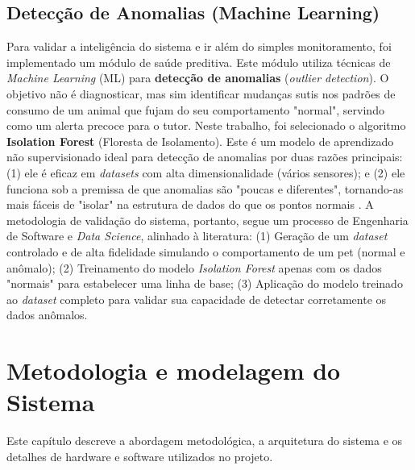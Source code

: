 \section{Detecção de Anomalias (Machine Learning)}
\label{sec:ml_theory}
Para validar a inteligência do sistema e ir além do simples monitoramento, foi implementado um módulo de saúde preditiva.
Este módulo utiliza técnicas de \textit{Machine Learning} (ML) para \textbf{detecção de anomalias} (\textit{outlier detection}).
O objetivo não é diagnosticar, mas sim identificar mudanças sutis nos padrões de consumo de um animal que fujam do seu comportamento "normal", servindo como um alerta precoce para o tutor.
Neste trabalho, foi selecionado o algoritmo \textbf{Isolation Forest} (Floresta de Isolamento).
Este é um modelo de aprendizado não supervisionado ideal para detecção de anomalias por duas razões principais: (1) ele é eficaz em \textit{datasets} com alta dimensionalidade (vários sensores);
e (2) ele funciona sob a premissa de que anomalias são "poucas e diferentes", tornando-as mais fáceis de "isolar" na estrutura de dados do que os pontos normais \cite{isolation_forest_paper}.
A metodologia de validação do sistema, portanto, segue um processo de Engenharia de Software e \textit{Data Science}, alinhado à literatura: (1) Geração de um \textit{dataset} controlado e de alta fidelidade simulando o comportamento de um pet (normal e anômalo);
(2) Treinamento do modelo \textit{Isolation Forest} apenas com os dados "normais" para estabelecer uma linha de base;
(3) Aplicação do modelo treinado ao \textit{dataset} completo para validar sua capacidade de detectar corretamente os dados anômalos.









\chapter {Metodologia e modelagem do Sistema}
Este capítulo descreve a abordagem metodológica, a arquitetura do sistema e os detalhes de hardware e software utilizados no projeto.
